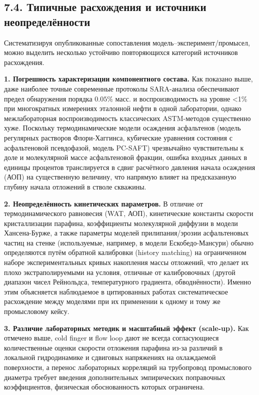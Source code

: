 \documentclass[11pt]{extarticle}
\begin{document}
\subsection{7.4. Типичные расхождения и источники неопределённости}\label{ux442ux438ux43fux438ux447ux43dux44bux435-ux440ux430ux441ux445ux43eux436ux434ux435ux43dux438ux44f-ux438-ux438ux441ux442ux43eux447ux43dux438ux43aux438-ux43dux435ux43eux43fux440ux435ux434ux435ux43bux451ux43dux43dux43eux441ux442ux438}

Систематизируя опубликованные сопоставления модель--эксперимент/промысел, можно выделить несколько устойчиво повторяющихся категорий источников расхождения.

\textbf{1. Погрешность характеризации компонентного состава.} Как показано выше, даже наиболее точные современные протоколы SARA-анализа обеспечивают предел обнаружения порядка \(0.05\%\) масс. и воспроизводимость на уровне \textless1\% при многократных измерениях эталонной нефти в одной лаборатории, однако межлабораторная воспроизводимость классических ASTM-методов существенно хуже. Поскольку термодинамические модели осаждения асфальтенов (модель регулярных растворов Флори-Хаггинса, кубические уравнения состояния с асфальтеновой псевдофазой, модель PC-SAFT) чрезвычайно чувствительны к доле и молекулярной массе асфальтеновой фракции, ошибка входных данных в единицы процентов транслируется в сдвиг расчётного давления начала осаждения (АОП) на существенную величину, что напрямую влияет на предсказанную глубину начала отложений в стволе скважины.

\textbf{2. Неопределённость кинетических параметров.} В отличие от термодинамического равновесия (WAT, АОП), кинетические константы скорости кристаллизации парафина, коэффициенты молекулярной диффузии в модели Хансена-Бурже, а также параметры моделей прилипания/эрозии асфальтеновых частиц на стенке (используемые, например, в модели Ескобедо-Мансури) обычно определяются путём обратной калибровки (history matching) на ограниченном наборе экспериментальных кривых накопления массы отложений, что делает их плохо экстраполируемыми на условия, отличные от калибровочных (другой диапазон чисел Рейнольдса, температурного градиента, обводнённости). Именно этим объясняется наблюдаемое в цитированных работах систематическое расхождение между моделями при их применении к одному и тому же промысловому кейсу.

\textbf{3. Различие лабораторных методик и масштабный эффект (scale-up).} Как отмечено выше, cold finger и flow loop дают не всегда согласующиеся количественные оценки скорости отложения парафина из-за различий в локальной гидродинамике и сдвиговых напряжениях на охлаждаемой поверхности, а перенос лабораторных корреляций на трубопровод промыслового диаметра требует введения дополнительных эмпирических поправочных коэффициентов, физическая обоснованность которых ограничена.
\end{document}
